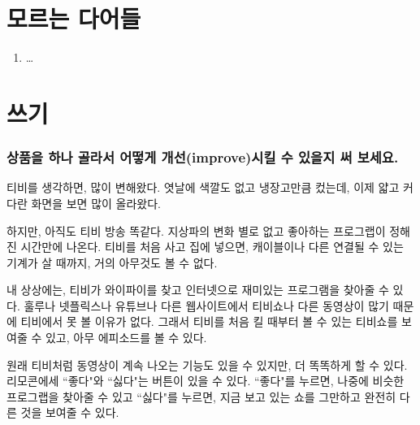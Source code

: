 \documentclass[11pt]{article}
\begin{document}
\section{모르는 다어들}
\begin{enumerate}
  \item \ldots
\end{enumerate}
\section{쓰기}
\doublespacing
\subsubsection*{상품을 하나 골라서 어떻게 개선(improve)시킬 수 있을지 써 보세요.}

티비를 생각하면, 많이 변해왔다. 엿날에 색깔도 없고 냉장고만큼 컸는데, 이제 얇고 커다란 화면을 보면 많이 올라왔다.

하지만, 아직도 티비 방송 똑같다. 지상파의 변화 별로 없고 좋아하는 프로그랩이 정해진 시간만에 나온다. 티비를 처음 사고 집에 넣으면, 캐이블이나 다른 연결될 수 있는 기계가 살 때까지, 거의 아무것도 볼 수 없다.

내 상상에는, 티비가 와이파이를 찾고 인터넷으로 재미있는 프로그램을 찾아줄 수 있다. 훌루나 넷플릭스나 유튜브나 다른 웹사이트에서 티비쇼나 다른 동영상이 많기 때문에 티비에서 못 볼 이유가 없다.  그래서 티비를 처음 킬 때부터 볼 수 있는 티비쇼를 보여줄 수 있고, 아무 에피소드를 볼 수 있다.

원래 티비처럼 동영상이 계속 나오는 기능도 있을 수 있지만, 더 똑똑하게 할 수 있다.  리모콘에세 ``좋다"와 ``싫다"는 버튼이 있을 수 있다.  ``좋다"를 누르면, 나중에 비슷한 프로그랩을 찾아줄 수 있고 ``싫다"를 누르면, 지금 보고 있는 쇼를 그만하고 완전히 다른 것을 보여줄 수 있다.
\end{document}
